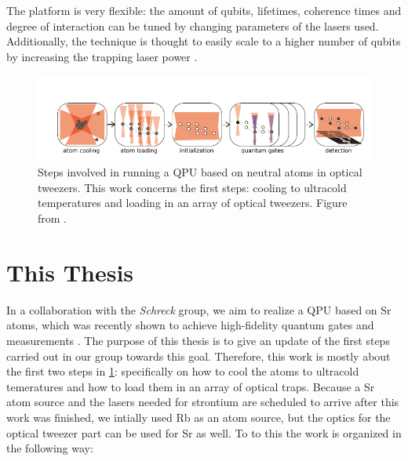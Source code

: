 The platform is very flexible: the amount of qubits, lifetimes, coherence times and degree of interaction can be tuned by changing parameters of the lasers used. 
Additionally, the technique is thought to easily scale to a higher number of qubits by increasing the trapping laser power \cite{Henriet2020}.

\begin{figure}
	\centering
	\includegraphics[width=\linewidth]{figures/ComputingSteps.pdf}
	\caption{Steps involved in running a \ac{QPU} based on neutral atoms in optical tweezers. 
	This work concerns the first steps: cooling to ultracold temperatures and loading in an array of optical tweezers.
	Figure from \cite{Wu2021}.}
	\label{fig:ComputingSteps}
\end{figure}

\section{This Thesis}

In a collaboration with the \textit{Schreck} group, we aim to realize a \ac{QPU} based on \ac{Sr} atoms, which was recently shown to achieve high-fidelity quantum gates and measurements \cite{Madjarov2020}. 
The purpose of this thesis is to give an update of the first steps carried out in our group towards this goal.
Therefore, this work is mostly about the first two steps in \cref{fig:ComputingSteps}: specifically on how to cool the atoms to ultracold temeratures and how to load them in an array of optical traps.
Because a Sr atom source and the lasers needed for strontium are scheduled to arrive after this work was finished, we intially used \ac{Rb} as an atom source, but the optics for the optical tweezer part can be used for \ac{Sr} as well.
To to this the work is organized in the following way:

